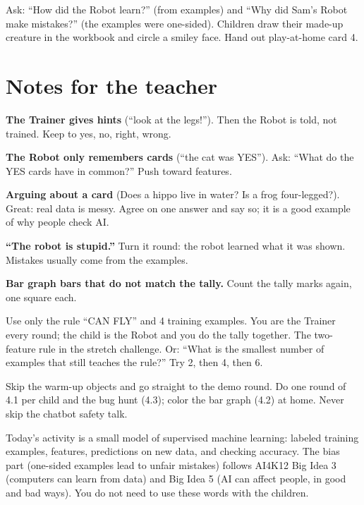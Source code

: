 \begin{reflection}
Ask: \enquote{How did the Robot learn?} (from examples) and \enquote{Why did Sam's Robot make mistakes?} (the examples were one-sided). Children draw their made-up creature in the workbook and circle a smiley face. Hand out play-at-home card 4.
\end{reflection}

\section{Notes for the teacher}
\begin{commonmistakes}
  \item \textbf{The Trainer gives hints} (\enquote{look at the legs!}). Then the Robot is told, not trained. Keep to yes, no, right, wrong.
  \item \textbf{The Robot only remembers cards} (\enquote{the cat was YES}). Ask: \enquote{What do the YES cards have in common?} Push toward features.
  \item \textbf{Arguing about a card} (Does a hippo live in water? Is a frog four-legged?). Great: real data is messy. Agree on one answer and say so; it is a good example of why people check AI.
  \item \textbf{\enquote{The robot is stupid.}} Turn it round: the robot learned what it was shown. Mistakes usually come from the examples.
  \item \textbf{Bar graph bars that do not match the tally.} Count the tally marks again, one square each.
\end{commonmistakes}

\begin{differentiation}
\supportpath Use only the rule \enquote{CAN FLY} and 4 training examples. You are the Trainer every round; the child is the Robot and you do the tally together.
\extensionpath The two-feature rule in the stretch challenge. Or: \enquote{What is the smallest number of examples that still teaches the rule?} Try 2, then 4, then 6.
\end{differentiation}

\begin{teachernote}
Skip the warm-up objects and go straight to the demo round. Do one round of 4.1 per child and the bug hunt (4.3); color the bar graph (4.2) at home. Never skip the chatbot safety talk.
\end{teachernote}

\begin{teachernote}
Today's activity is a small model of supervised machine learning: labeled training examples, features, predictions on new data, and checking accuracy. The bias part (one-sided examples lead to unfair mistakes) follows AI4K12 Big Idea 3 (computers can learn from data) and Big Idea 5 (AI can affect people, in good and bad ways). You do not need to use these words with the children.
\end{teachernote}

